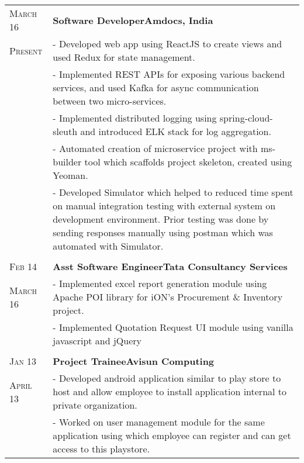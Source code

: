 \documentclass[a4paper,10pt]{extarticle} %
\begin{document}
\begin{tabularx}{\linewidth}{ l | X }

\textsc{March 16} & \textbf{Software Developer}\hfill\textbf{Amdocs, India}\\
\textsc{Present}& {- Developed web app using ReactJS to create views and used Redux for state management.}\\
& {- Implemented REST APIs for exposing various backend services, and used Kafka for async communication between two micro-services.}\\
& {- Implemented distributed logging using spring-cloud-sleuth and introduced ELK stack for log aggregation.}\\
& {- Automated creation of microservice project with ms-builder tool which scaffolds project skeleton, created using Yeoman.}\\
& {- Developed Simulator which helped to reduced time spent on manual integration testing with external system on development environment. Prior testing was done by sending responses manually using postman which was automated with Simulator.}\\

\multicolumn{2}{c}{} \\

\textsc{Feb 14} & \textbf{Asst Software Engineer}\hfill\textbf{Tata Consultancy Services}\\
\textsc{March 16}& {- Implemented excel report generation module using Apache POI library for iON's Procurement \& Inventory project.}\\
& {- Implemented Quotation Request UI module using vanilla javascript and jQuery}\\
\multicolumn{2}{c}{} \\

\textsc{Jan 13} & \textbf{Project Trainee}\hfill\textbf{Avisun Computing}\\
\textsc{April 13} & {- Developed android application similar to play store to host and allow employee to install application internal to private organization.}\\
& {- Worked on user management module for the same application using which employee can register and can get access to this playstore.}

\end{tabularx}



\end{document}
